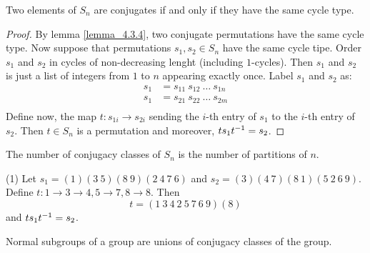 \begin{lemma}\label{lemma_4.3.5}
  Two elements of $S_n$ are conjugates if and only if they have the same cycle
  type.
\end{lemma}
\begin{proof}
  By lemma \ref{lemma_4.3.4}, two conjugate permutations have the same cycle type.
  Now suppose that permutations $s_1,s_2 \in S_n$ have the same cycle tipe.
  Order $s_1$ and $s_2$ in cycles of non-decreasing lenght (including
  $1$-cycles). Then $s_1$ and $s_2$ is just a list of integers from $1$ to
  $n$ appearing exactly once. Label  $s_1$ and $s_2$ as:
  \begin{align*}
    s_1     &=      s_{11} \ s_{12} \ \dots \ s_{1n}   \\
    s_1     &=      s_{21} \ s_{22} \ \dots \ s_{2m}   \\
  \end{align*}
  Define now, the map $t:s_{1i} \xrightarrow{} s_{2i}$ sending the $i$-th
  entry of  $s_1$ to the $i$-th entry of $s_2$. Then $t \in S_n$ is a
  permutation and moreover,  $ts_1t^{-1}=s_2$.
\end{proof}
\begin{corollary}
  The number of conjugacy classes of $S_n$ is the number of partitions of
  $n$.
\end{corollary}

\begin{example}\label{example_4.9}
\item[(1)] Let $s_1=(1)(3 \ 5)(8 \ 9)(2 \ 4 \ 7 \ 6)$ and $s_2=(3)(4 \ 7)(8 \
  1)(5 \ 2 \ 6 \ 9)$. Define $t:1 \xrightarrow{} 3 \xrightarrow{} 4, 5
  \xrightarrow{} 7, 8 \xrightarrow{} 8$. Then
  \begin{equation*}
    t=(1 \ 3 \ 4 \ 2 \ 5 \ 7 \ 6 \ 9)(8)
  \end{equation*}
  and $ts_1t^{-1}=s_2$.
\end{example}

\begin{lemma}\label{lemma_4.3.6}
  Normal subgroups of a group are unions of conjugacy classes of the group.
\end{lemma}

